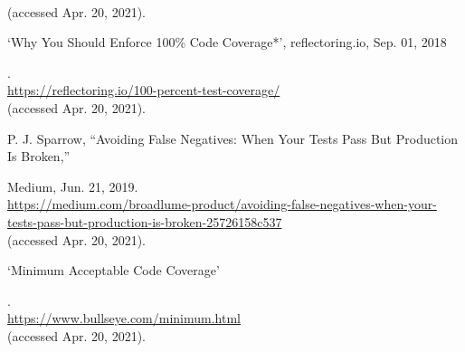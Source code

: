 \documentclass{article}
\begin{document}
\begin{enumerate}[label={[\arabic*]}, noitemsep]
    \\(accessed Apr. 20, 2021).
    \\
\item \hypertarget{8}{‘Why You Should Enforce 100\% Code Coverage*’, reflectoring.io, Sep. 01, 2018}. 
    \\\url{https://reflectoring.io/100-percent-test-coverage/} 
    \\(accessed Apr. 20, 2021).
    \\
\item  \hypertarget{9}{P. J. Sparrow, “Avoiding False Negatives: When Your Tests Pass But Production Is Broken,”} Medium, Jun. 21, 2019.                                         \\\url{https://medium.com/broadlume-product/avoiding-false-negatives-when-your-tests-pass-but-production-is-broken-25726158c537} 
    \\(accessed Apr. 20, 2021).
    \\
\item \hypertarget{10}{‘Minimum Acceptable Code Coverage’}. 
    \\\url{https://www.bullseye.com/minimum.html} 
    \\(accessed Apr. 20, 2021).

\end{enumerate}
\end{document}
